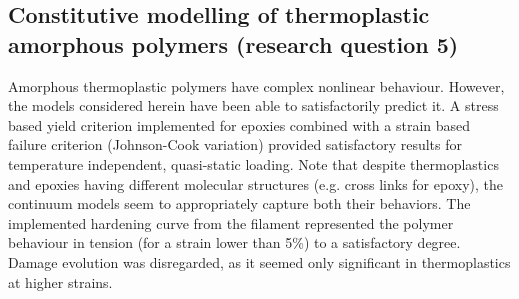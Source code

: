 \subsection{Constitutive modelling of thermoplastic amorphous polymers (research question 5)}
Amorphous thermoplastic polymers have complex nonlinear behaviour. However, the models considered herein have been able to satisfactorily predict it.  A stress based yield criterion implemented for epoxies combined with a strain based failure criterion (Johnson-Cook variation) provided satisfactory results for temperature independent, quasi-static loading. Note that despite thermoplastics and epoxies having different molecular structures (e.g. cross links for epoxy), the continuum models seem to appropriately capture both their behaviors. The implemented hardening curve from the filament represented the polymer behaviour in tension (for a strain lower than 5\%) to a satisfactory degree. Damage evolution was disregarded, as it seemed only significant in thermoplastics at higher strains. 


